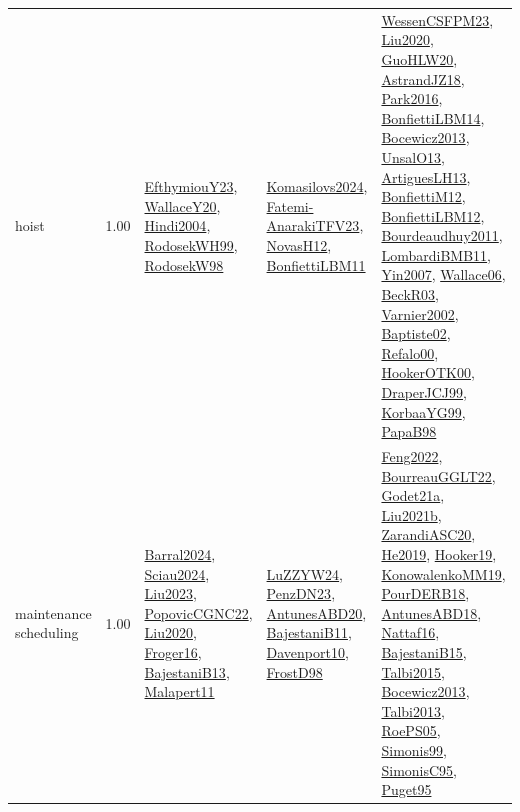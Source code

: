 {\begin{longtable}{p{3cm}r>{\raggedright\arraybackslash}p{6cm}>{\raggedright\arraybackslash}p{6cm}>{\raggedright\arraybackslash}p{8cm}}
\index{hoist}\index{ApplicationAreas!hoist}hoist &  1.00 & \hyperref[detail:EfthymiouY23]{EfthymiouY23}, \hyperref[detail:WallaceY20]{WallaceY20}, \hyperref[detail:Hindi2004]{Hindi2004}, \hyperref[detail:RodosekWH99]{RodosekWH99}, \hyperref[detail:RodosekW98]{RodosekW98} & \hyperref[detail:Komasilovs2024]{Komasilovs2024}, \hyperref[detail:Fatemi-AnarakiTFV23]{Fatemi-AnarakiTFV23}, \hyperref[detail:NovasH12]{NovasH12}, \hyperref[detail:BonfiettiLBM11]{BonfiettiLBM11} & \hyperref[detail:WessenCSFPM23]{WessenCSFPM23}, \hyperref[detail:Liu2020]{Liu2020}, \hyperref[detail:GuoHLW20]{GuoHLW20}, \hyperref[detail:AstrandJZ18]{AstrandJZ18}, \hyperref[detail:Park2016]{Park2016}, \hyperref[detail:BonfiettiLBM14]{BonfiettiLBM14}, \hyperref[detail:Bocewicz2013]{Bocewicz2013}, \hyperref[detail:UnsalO13]{UnsalO13}, \hyperref[detail:ArtiguesLH13]{ArtiguesLH13}, \hyperref[detail:BonfiettiM12]{BonfiettiM12}, \hyperref[detail:BonfiettiLBM12]{BonfiettiLBM12}, \hyperref[detail:Bourdeaudhuy2011]{Bourdeaudhuy2011}, \hyperref[detail:LombardiBMB11]{LombardiBMB11}, \hyperref[detail:Yin2007]{Yin2007}, \hyperref[detail:Wallace06]{Wallace06}, \hyperref[detail:BeckR03]{BeckR03}, \hyperref[detail:Varnier2002]{Varnier2002}, \hyperref[detail:Baptiste02]{Baptiste02}, \hyperref[detail:Refalo00]{Refalo00}, \hyperref[detail:HookerOTK00]{HookerOTK00}, \hyperref[detail:DraperJCJ99]{DraperJCJ99}, \hyperref[detail:KorbaaYG99]{KorbaaYG99}, \hyperref[detail:PapaB98]{PapaB98}\\
\index{maintenance scheduling}\index{ApplicationAreas!maintenance scheduling}maintenance scheduling &  1.00 & \hyperref[detail:Barral2024]{Barral2024}, \hyperref[detail:Sciau2024]{Sciau2024}, \hyperref[detail:Liu2023]{Liu2023}, \hyperref[detail:PopovicCGNC22]{PopovicCGNC22}, \hyperref[detail:Liu2020]{Liu2020}, \hyperref[detail:Froger16]{Froger16}, \hyperref[detail:BajestaniB13]{BajestaniB13}, \hyperref[detail:Malapert11]{Malapert11} & \hyperref[detail:LuZZYW24]{LuZZYW24}, \hyperref[detail:PenzDN23]{PenzDN23}, \hyperref[detail:AntunesABD20]{AntunesABD20}, \hyperref[detail:BajestaniB11]{BajestaniB11}, \hyperref[detail:Davenport10]{Davenport10}, \hyperref[detail:FrostD98]{FrostD98} & \hyperref[detail:Feng2022]{Feng2022}, \hyperref[detail:BourreauGGLT22]{BourreauGGLT22}, \hyperref[detail:Godet21a]{Godet21a}, \hyperref[detail:Liu2021b]{Liu2021b}, \hyperref[detail:ZarandiASC20]{ZarandiASC20}, \hyperref[detail:He2019]{He2019}, \hyperref[detail:Hooker19]{Hooker19}, \hyperref[detail:KonowalenkoMM19]{KonowalenkoMM19}, \hyperref[detail:PourDERB18]{PourDERB18}, \hyperref[detail:AntunesABD18]{AntunesABD18}, \hyperref[detail:Nattaf16]{Nattaf16}, \hyperref[detail:BajestaniB15]{BajestaniB15}, \hyperref[detail:Talbi2015]{Talbi2015}, \hyperref[detail:Bocewicz2013]{Bocewicz2013}, \hyperref[detail:Talbi2013]{Talbi2013}, \hyperref[detail:RoePS05]{RoePS05}, \hyperref[detail:Simonis99]{Simonis99}, \hyperref[detail:SimonisC95]{SimonisC95}, \hyperref[detail:Puget95]{Puget95}\\

\end{longtable}}
